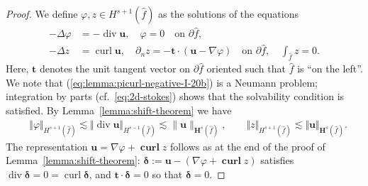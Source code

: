 \documentclass{article}
\begin{document}
\begin{proof}
We define $\varphi,z\in H^{s+1}(\widehat{f})$ as the solutions of the equations
\begin{subequations}
\begin{align}
-\Delta\varphi &  =-\operatorname{div}{\mathbf{u}},\quad\varphi
=0\quad\text{on }\partial \widehat{f},
\label{eq:lemma:picurl-negative-I-20a}\\
-\Delta z  &  =\operatorname{curl}{\mathbf{u}},\quad\partial_{n}%
z=-{\mathbf{t}}%
\cdot({\mathbf{u}}-\nabla\varphi)\quad\text{on }\partial \widehat{f},\quad\int_{\widehat{f}}z=0.
\label{eq:lemma:picurl-negative-I-20b}%
\end{align}
\end{subequations}
Here, ${\mathbf{t}}$ denotes the unit tangent vector on $\partial \widehat{f}$ oriented
such that $\widehat{f}$ is \textquotedblleft on the left\textquotedblright. We note that
(\ref{eq:lemma:picurl-negative-I-20b}) is a Neumann problem; integration by
parts (cf.~\eqref{eq:2d-stokes}) 
shows that the solvability condition is satisfied. By Lemma~\ref{lemma:shift-theorem} we have
\begin{align}
&\Vert\varphi\Vert_{H^{s+1}(\widehat{f})}\lesssim\Vert\operatorname{div}{\mathbf{u}}\Vert_{H^{s-1}(\widehat{f})} \lesssim \|\mathbf{u}\|_{\mathbf{H}^s(\widehat{f})},\qquad\Vert z\Vert_{H^{s+1}(\widehat{f})}\lesssim\Vert{\mathbf{u}}%
\Vert_{{\mathbf{H}}^{s}(\widehat{f})}. 
\end{align}
The representation ${\mathbf u} = \nabla \varphi + \operatorname{\mathbf{curl}} z$ follows as 
at the end of the proof of Lemma~\ref{lemma:shift-theorem}: 
${\boldsymbol \delta}:= {\mathbf u} - (\nabla \varphi + \operatorname{\mathbf{curl}} z)$ satisfies 
$\operatorname{div} {\boldsymbol \delta} = 0 = 
\operatorname{curl} {\boldsymbol \delta}$, and ${\mathbf t} \cdot {\boldsymbol \delta} = 0$
so that ${\boldsymbol \delta} = 0$.
\end{proof}
\end{document}

